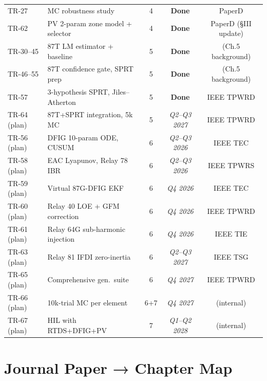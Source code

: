 \documentclass[11pt, a4paper]{article}
\newcommand{\done}[1]{\textcolor{donecol}{\textbf{#1}}}
\newcommand{\plan}[1]{\textcolor{planned}{\textit{#1}}}
\begin{document}
\begin{longtable}{lp{6.5cm}ccc}
TR-27 & MC robustness study & 4 & \done{Done} & PaperD \\
TR-62 & PV 2-param zone model + selector & 4 & \done{Done} & PaperD (§III update) \\
TR-30--45 & 87T LM estimator + baseline & 5 & \done{Done} & (Ch.5 background) \\
TR-46--55 & 87T confidence gate, SPRT prep & 5 & \done{Done} & (Ch.5 background) \\
TR-57 & 3-hypothesis SPRT, Jiles--Atherton & 5 & \done{Done} & IEEE TPWRD \\
TR-64 (plan) & 87T+SPRT integration, 5k MC & 5 & \plan{Q2--Q3 2027} & IEEE TPWRD \\
TR-56 (plan) & DFIG 10-param ODE, CUSUM & 6 & \plan{Q2--Q3 2026} & IEEE TEC \\
TR-58 (plan) & EAC Lyapunov, Relay 78 IBR & 6 & \plan{Q2--Q3 2026} & IEEE TPWRS \\
TR-59 (plan) & Virtual 87G-DFIG EKF & 6 & \plan{Q4 2026} & IEEE TEC \\
TR-60 (plan) & Relay 40 LOE + GFM correction & 6 & \plan{Q4 2026} & IEEE TPWRD \\
TR-61 (plan) & Relay 64G sub-harmonic injection & 6 & \plan{Q4 2026} & IEEE TIE \\
TR-63 (plan) & Relay 81 IFDI zero-inertia & 6 & \plan{Q2--Q3 2027} & IEEE TSG \\
TR-65 (plan) & Comprehensive gen.\ suite & 6 & \plan{Q4 2027} & IEEE TPWRD \\
TR-66 (plan) & 10k-trial MC per element & 6+7 & \plan{Q4 2027} & (internal) \\
TR-67 (plan) & HIL with RTDS+DFIG+PV & 7 & \plan{Q1--Q2 2028} & (internal) \\
\end{longtable}

\section{Journal Paper → Chapter Map}
\label{sec:papers}
\end{document}
